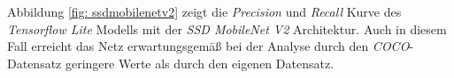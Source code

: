 



Abbildung \ref{fig: ssdmobilenetv2} zeigt die \textit{Precision} und \textit{Recall} Kurve des \textit{Tensorflow Lite} Modells mit der \textit{SSD MobileNet V2} Architektur. Auch in diesem Fall erreicht das Netz erwartungsgemäß bei der Analyse durch den \textit{COCO}-Datensatz geringere Werte als durch den eigenen Datensatz.    







